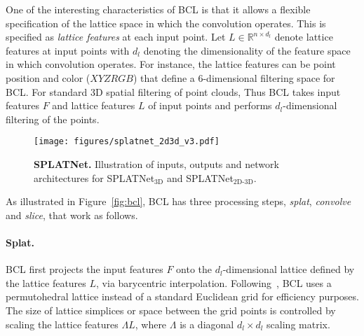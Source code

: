 \documentclass[10pt,twocolumn,letterpaper]{article}
\newcommand{\mycaption}[2]{\caption{\textbf{#1.}\xspace#2}}
\begin{document}
One of the interesting characteristics of BCL is that it allows a flexible specification
of the lattice space in which the convolution operates. This is specified as \emph{lattice features} at 
each input point. Let $L \in \mathbb{R}^{n \times d_l}$ denote lattice features at input points
with $d_l$ denoting the dimensionality of the feature space in which convolution operates.
For instance, the lattice features can be 
point position and color ($XYZRGB$)
that define a 6-dimensional filtering space for BCL. For standard 3D spatial filtering of point clouds,
Thus BCL takes input features $F$ and lattice features $L$ of input points and performs $d_l$-dimensional filtering of the points. 

\begin{figure*}[!ht]
    \vspace{-0.2cm}
    \centering
    \texttt{[image: figures/splatnet\_2d3d\_v3.pdf]}
    \vspace{-0.2cm}
    \mycaption{SPLATNet}{Illustration of inputs, outputs and network architectures for SPLATNet$_{\text{3D}}$ and SPLATNet$_{\text{2D-3D}}$.}
    \label{fig:splatnet}
    \vspace{-0.25cm}
\end{figure*}%
As illustrated in Figure~\ref{fig:bcl}, 
BCL has three processing steps, \emph{splat}, \emph{convolve} and \emph{slice}, that work as follows.

\vspace{-0.35cm}\paragraph{Splat.} BCL first projects the input features $F$ onto the $d_l$-dimensional
lattice defined by the lattice features $L$, via barycentric interpolation. 
Following~\cite{adams2010fast}, BCL uses a permutohedral
lattice instead of a standard Euclidean grid for efficiency purposes. The size of lattice simplices
or space between the grid points is controlled by scaling the lattice features $\Lambda L$,
where $\Lambda$ is a diagonal $d_l\times d_l$ scaling matrix.
\end{document}
